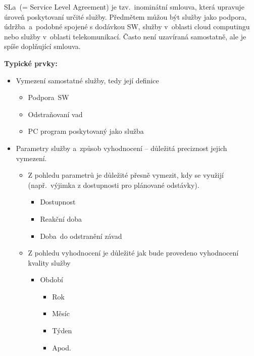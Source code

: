 SLa~(= Service Level Agreement) je tzv.\ inominátní smlouva, která upravuje úroveň poskytovaní určité služby. Předmětem můžou být služby jako podpora, údržba~a~podobné spojené s dodávkou SW, služby v~oblasti cloud computingu nebo služby v~oblasti telekomunikací. Často není uzavíraná samostatně, ale je spíše doplňující smlouva.
\newline

\noindent\textbf{Typické prvky:}
\begin{itemize}[noitemsep]
    \item Vymezení samostatné služby, tedy její definice
          \begin{itemize}[noitemsep]
              \item Podpora~SW
              \item Odstraňovaní vad
              \item PC program poskytovaný jako služba
          \end{itemize}
    \item Parametry služby a~způsob vyhodnocení -- důležitá preciznost jejich vymezení.
          \begin{itemize}[noitemsep]
              \item Z pohledu parametrů je důležité přesně vymezit, kdy se využijí (např.\ výjimka z dostupnosti pro plánované odstávky).
                    \begin{itemize}[noitemsep]
                        \item Dostupnost
                        \item Reakční doba
                        \item Doba~do odstranění závad
                    \end{itemize}
              \item  Z pohledu vyhodnocení je důležité jak bude provedeno vyhodnocení kvality služby
                    \begin{itemize}[noitemsep]
                        \item Období
                              \begin{itemize}[noitemsep]
                                  \item Rok
                                  \item Měsíc
                                  \item Týden
                                  \item Apod.
                              \end{itemize}

\end{itemize}
\end{itemize}
\end{itemize}
